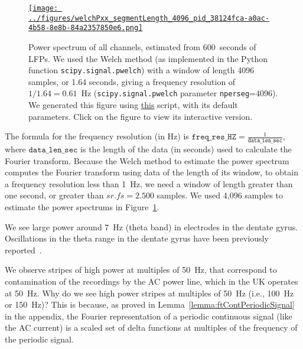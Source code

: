 \documentclass[12pt]{article}
\begin{document}
\begin{figure}[H]
    \begin{center}
        \href{https://www.gatsby.ucl.ac.uk/~rapela/neuroinformatics/2023/ws3/figures/welchPxx_segmentLength_4096_pid_38124fca-a0ac-4b58-8e8b-84a2357850e6.html}{\texttt{[image: ../figures/welchPxx\_segmentLength\_4096\_pid\_38124fca-a0ac-4b58-8e8b-84a2357850e6.png]}}

        \caption{Power spectrum of all channels, estimated from 600~seconds of
        LFPs.
        We used the Welch method (as
        implemented in the Python function \texttt{scipy.signal.pwelch}) with a
        window of length 4096 samples, or 1.64 seconds, giving a frequency
        resolution of $1/1.64=0.61$~Hz (\texttt{scipy.signal.pwelch} parameter
        \texttt{nperseg}=4096). We generated this figure using
        \href{https://github.com/joacorapela/neuroinformatics23/blob/master/worksheets/ws3/mySolution/code/scripts/doPlotWelchPxxAllChannels.py}{this}
        script, with its default parameters.
        Click on the figure to view its interactive version.  }

                \label{fig:pxxAllChannels}

            \end{center}
        \end{figure}

The formula for the frequency resolution (in Hz) is
$\mathtt{freq\_res\_HZ}=\frac{1}{\mathtt{data\_len\_sec}}$, where
$\mathtt{data\_len\_sec}$ is the length of the data (in seconds) used to
calculate the Fourier transform. Because the Welch method to estimate the power
spectrum computes the Fourier transform using data of the length of its window,
to obtain a frequency resolution less than 1~Hz, we need a window of length
greater than one second, or greater than $sr.fs=2.500$ samples. We used 4,096
samples to estimate the power spectrums in Figure~\ref{fig:pxxAllChannels}.

We see large power around 7~Hz (theta band) in electrodes in the dentate gyrus.
Oscillations in the theta range in the dentate gyrus have been previously
reported~\citep[e.g.,][]{rangelEtAl15}.

We observe stripes of high power at multiples of 50~Hz, that correspond to
contamination of the recordings by the AC power line, which in the UK operates
at 50~Hz. Why do we see high power stripes at multiples of 50~Hz (i.e., 100~Hz
or 150~Hz)? This is because, as proved in
Lemma~\ref{lemma:ftContPeriodicSignal} in the appendix, the Fourier
representation of a periodic continuous signal (like the AC current) is a
scaled set of delta functions at multiples of the frequency of the periodic
signal.
\end{document}
